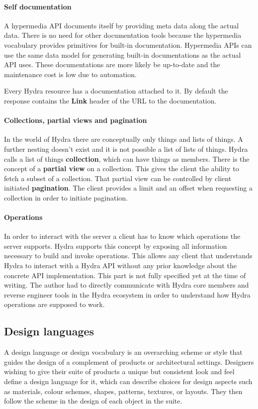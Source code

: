\paragraph{Self documentation}
A hypermedia API documents itself by providing meta data along the actual data. There is no need for other documentation tools because the hypermedia vocabulary provides primitives for built-in documentation.
Hypermedia APIs can use the same data model for generating built-in documentations as the actual API uses. These documentations are more likely be up-to-date and the maintenance cost is low due to automation.

Every Hydra resource has a documentation attached to it. By default the response contains the \textbf{Link} header of the URL to the documentation.

\paragraph{Collections, partial views and pagination}
In the world of Hydra there are conceptually only things and lists of things. A further nesting doesn't exist and it is not possible a list of lists of things.
Hydra calls a list of things \textbf{collection}, which can have things as members. There is the concept of a \textbf{partial view} on a collection. This gives the client the ability to fetch a subset of a collection. That partial view can be controlled by client initiated \textbf{pagination}. The client provides a limit and an offset when requesting a collection in order to initiate pagination.

\paragraph{Operations}
In order to interact with the server a client has to know which operations the server supports. Hydra supports this concept by exposing all information necessary to build and invoke operations. This allows any client that understands Hydra to interact with a Hydra API without any prior knowledge about the concrete API implementation. This part is not fully specified yet at the time of writing. The author had to directly communicate with Hydra core members and reverse engineer tools in the Hydra ecosystem in order to understand how Hydra operations are supposed to work.

\subsection{Design languages}
A design language or design vocabulary is an overarching scheme or style that guides the design of a complement of products or architectural settings. Designers wishing to give their suite of products a unique but consistent look and feel define a design language for it, which can describe choices for design aspects such as materials, colour schemes, shapes, patterns, textures, or layouts. They then follow the scheme in the design of each object in the suite. \citep{designlanguage}

